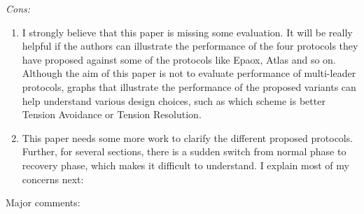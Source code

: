 \documentclass[letterpaper,twocolumn,10pt]{article}
\newenvironment{reviewerquote}
{\list{}{\leftmargin=\parindent\rightmargin=0in}\item[] \itshape \color{ReviewerDarkGray}}%
{\endlist}
\begin{document}
\begin{reviewerquote}
  Cons:

  \begin{enumerate}
    \setcounter{enumi}{0}
    \item
      I strongly believe that this paper is missing some evaluation. It will be
      really helpful if the authors can illustrate the performance of the four
      protocols they have proposed against some of the protocols like Epaox,
      Atlas and so on. Although the aim of this paper is not to evaluate
      performance of multi-leader protocols, graphs that illustrate the
      performance of the proposed variants can help understand various design
      choices, such as which scheme is better Tension Avoidance or Tension
      Resolution.
    \item
      This paper needs some more work to clarify the different proposed
      protocols. Further, for several sections, there is a sudden switch from
      normal phase to recovery phase, which makes it difficult to understand. I
      explain most of my concerns next:
  \end{enumerate}

  Major comments:


\end{reviewerquote}
\end{document}
